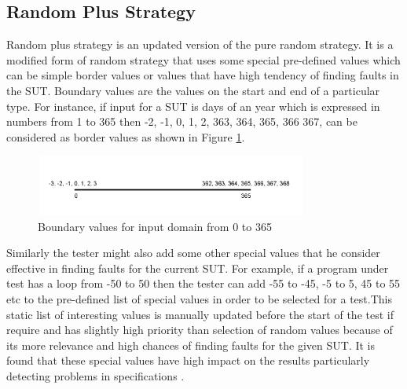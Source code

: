 \documentclass[conference]{IEEEtran}
\begin{document}
\subsection{Random Plus Strategy}
Random plus strategy \cite{Leitner2007} is an updated version of the pure random strategy. It is a modified form of random strategy that uses some special pre-defined values which can be simple border values or values that have high tendency of finding faults in the SUT. Boundary values \cite{Beizer1990} are the values on the start and end of a particular type. For instance,  if input for a SUT is days of an year which is expressed in numbers from 1 to 365 then -2, -1, 0, 1, 2, 363, 364, 365, 366 367, can be considered as border values as shown in Figure \ref{fig:boundaryValues}. 

\begin{figure}[ht]
\centering
\includegraphics[width= 9cm,height=2cm]{boundary.png}
\caption{Boundary values for input domain from 0 to 365}
\label{fig:boundaryValues}
\end{figure}

Similarly the tester might also add some other special values that he consider effective in finding faults for the current SUT. For example, if a program under test has a loop from -50 to 50 then the tester can add -55 to -45, -5 to 5, 45 to 55 etc to the pre-defined list of special values in order to be selected for a test.This static list of interesting values is manually updated before the start of the test if require and has slightly high priority than selection of random values because of its more relevance and high chances of finding faults for the given SUT. It is found that these special values have high impact on the results particularly detecting problems in specifications \cite{Ciupa2008}.
\end{document}
